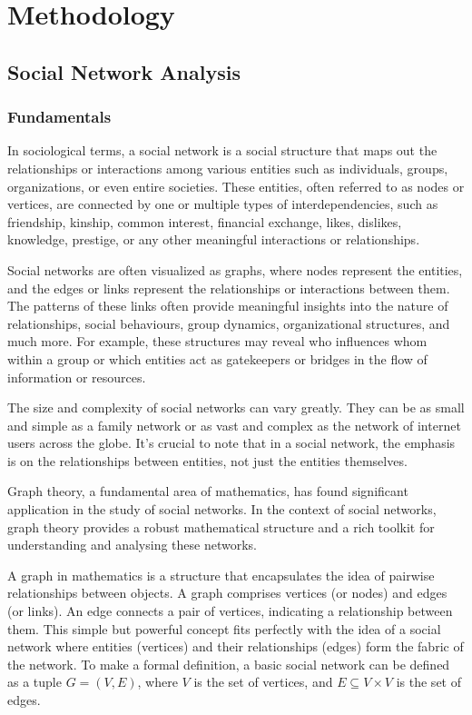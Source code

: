 \chapter{Methodology}
\label{ch:methods}

\section{Social Network Analysis}
\label{sec:social_networks}

\subsection{Fundamentals}
\label{sec:social_networks_fundamentals}

In sociological terms, a social network is a social structure that maps out the relationships or interactions among various entities such as individuals, groups, organizations, or even entire societies. These entities, often referred to as nodes or vertices, are connected by one or multiple types of interdependencies, such as friendship, kinship, common interest, financial exchange, likes, dislikes, knowledge, prestige, or any other meaningful interactions or relationships.

Social networks are often visualized as graphs, where nodes represent the entities, and the edges or links represent the relationships or interactions between them. The patterns of these links often provide meaningful insights into the nature of relationships, social behaviours, group dynamics, organizational structures, and much more. For example, these structures may reveal who influences whom within a group or which entities act as gatekeepers or bridges in the flow of information or resources.

The size and complexity of social networks can vary greatly. They can be as small and simple as a family network or as vast and complex as the network of internet users across the globe. It's crucial to note that in a social network, the emphasis is on the relationships between entities, not just the entities themselves.

Graph theory, a fundamental area of mathematics, has found significant application in the study of social networks. In the context of social networks, graph theory provides a robust mathematical structure and a rich toolkit for understanding and analysing these networks.

A graph in mathematics is a structure that encapsulates the idea of pairwise relationships between objects. A graph comprises vertices (or nodes) and edges (or links). An edge connects a pair of vertices, indicating a relationship between them. This simple but powerful concept fits perfectly with the idea of a social network where entities (vertices) and their relationships (edges) form the fabric of the network. To make a formal definition, a basic social network can be defined as a tuple $G = (V,E)$, where $V$ is the set of vertices, and $E \subseteq V \times V$ is the set of edges.

